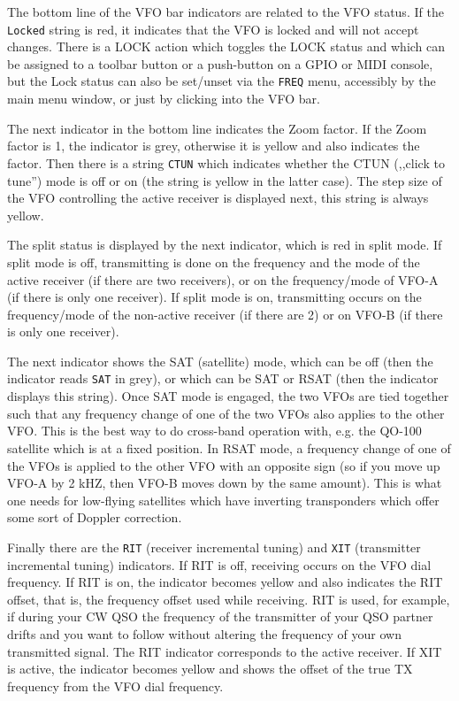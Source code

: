 \documentclass[12pt]{book}
\def\rett#1{\texttt{\color{red}#1}}
\def\bltt#1{\texttt{\color{blue}#1}}
\begin{document}
 The bottom line of the VFO bar  indicators are related to the VFO status.
 If the \rett{Locked} string is red, it indicates that the VFO is locked
 and will not accept changes. There is a LOCK action which toggles the
 LOCK status and which can be assigned to a toolbar button or a push-button
 on a GPIO or MIDI console, but the Lock status can also be set/unset
 via the \bltt{FREQ} menu, accessibly by the main menu window, or just by
 clicking into the VFO bar.
 
The next indicator in the bottom  line indicates the Zoom factor. If the
Zoom factor is 1, the indicator is grey, otherwise it is yellow and
also indicates the factor. Then there is a string \rett{CTUN} which
indicates whether the CTUN (,,click to tune'') mode is off or on (the string 
is yellow in the latter case). The step size of the VFO controlling the
active receiver is displayed next, this string is always yellow.

The split status is displayed by the next indicator, which is red in
split mode. If split mode is off, transmitting is done on the frequency
and the mode of the active receiver (if there are two receivers), or
on the frequency/mode of VFO-A (if there is only one receiver). If
split mode is on, transmitting occurs on the frequency/mode of the
non-active receiver (if there are 2) or on VFO-B (if there is only  one
receiver).

The next indicator shows the SAT (satellite) mode, which can be off
(then the indicator reads \rett{SAT} in grey), or which can be SAT or RSAT
(then the indicator displays this string). Once SAT mode is engaged,
the two VFOs are tied together such that any frequency change of one
of the two VFOs also applies to the other VFO. This is the best way
to do cross-band operation with, e.g. the QO-100 satellite which is at
a fixed position. In RSAT mode, a frequency change of one of the VFOs
is applied to the other VFO with an opposite sign (so if you move up
VFO-A by 2 kHZ, then VFO-B moves down by the same amount). This is
what one needs for low-flying satellites which have inverting
transponders which offer some sort of Doppler correction.

Finally there are the \rett{RIT} (receiver incremental tuning) and \rett{XIT}
(transmitter incremental tuning) indicators. If RIT is off,
receiving occurs on the VFO dial frequency. If RIT is on, the 
indicator becomes yellow and also indicates the RIT offset, that is,
the frequency offset used while receiving. RIT is used, for example,
if during your CW QSO the frequency of the transmitter of your
QSO partner drifts and you want to follow without altering the
frequency of your own transmitted signal. The RIT indicator
corresponds to the active receiver. If XIT is active, the
indicator becomes yellow and shows the offset of the true
TX frequency from the VFO dial frequency. 
\end{document}
